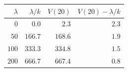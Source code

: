 \begin{tabular}{rrrr}
\toprule
$\lambda$ & $\lambda / k$ & $V(20)$ & $V(20) - \lambda / k$ \\
\midrule
$0$ & $0.0$ & $2.3$ & $2.3$ \\
$50$ & $166.7$ & $168.6$ & $1.9$ \\
$100$ & $333.3$ & $334.8$ & $1.5$ \\
$200$ & $666.7$ & $667.4$ & $0.8$ \\
\bottomrule
\end{tabular}

